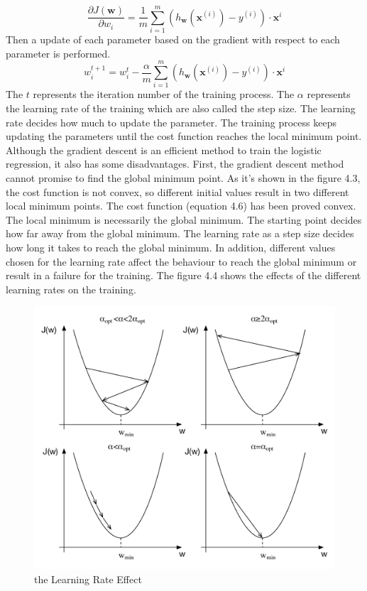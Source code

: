 \begin{equation}
\frac{\partial J(\textbf{w})}{\partial w_i} =  \frac{1}{m} \sum_{i=1}^m (h_{\textbf{w}} (\textbf{x}^{(i)})-y^{(i)}) \cdot \textbf{x}^{i}
\end{equation}
Then a update of each parameter based on the gradient with respect to each parameter is performed.
\begin{equation}
w_i^{t+1}= w_i^{t} - \frac{\alpha}{m} \sum_{i=1}^m (h_{\textbf{w}} (\textbf{x}^{(i)})-y^{(i)}) \cdot \textbf{x}^{i}
\end{equation}
The $t$ represents the iteration number of the training process. The $\alpha$ represents the learning rate of the training which are also called the step size. The learning rate decides how much to update the parameter. The training process  keeps updating the parameters until the cost function reaches the local minimum point.  Although the gradient descent is an efficient method to train the logistic regression, it also has some disadvantages. First, the gradient descent method cannot promise to find the global minimum point. As it's shown in the figure 4.3, the cost function is not convex, so different initial values result in two different local minimum points. The cost function (equation 4.6) has been proved convex. The local minimum is necessarily the global minimum. The starting point decides how far away from the global minimum. The learning rate as a step size decides how long it takes to reach the global minimum. In addition, different values chosen for the learning rate  affect the behaviour to reach the global minimum or result in a failure for the training. The figure 4.4 shows the effects of the different learning rates on the training.
\begin{figure}
\centering
\includegraphics[scale=0.6]{learningRate.pdf}
\caption{the Learning Rate Effect}
\end{figure}
